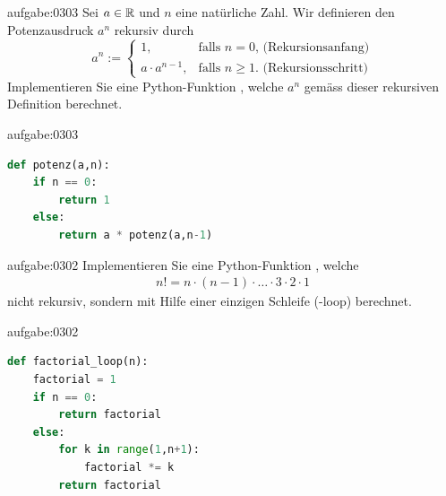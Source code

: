 \clearpage

\begin{aufgabe}{aufgabe:0303}
Sei $a\in\mathbb{R}$ und $n$ eine natürliche Zahl. Wir definieren den Potenzausdruck $a^n$ rekursiv durch
\[
  a^n := 
  \begin{cases}
    1, &\text{falls $n=0$, (Rekursionsanfang)} \\
    a\cdot a^{n-1}, & \text{falls  $n\geq 1$. (Rekursionsschritt)}
  \end{cases}
\]
Implementieren Sie eine Python-Funktion , welche $a^n$ gemäss dieser rekursiven Definition berechnet.
\end{aufgabe}
\begin{antwort}{aufgabe:0303}
\begin{lstlisting}[language=Python,caption=rekursive Potenz-Funktion]
def potenz(a,n):
    if n == 0:
        return 1
    else:
        return a * potenz(a,n-1)
\end{lstlisting}
\end{antwort}

\begin{aufgabe}{aufgabe:0302}
Implementieren Sie eine Python-Funktion , welche
\begin{align*}
    n! = n\cdot (n-1)\cdot\ldots\cdot 3\cdot 2\cdot 1
\end{align*}
nicht rekursiv, sondern mit Hilfe einer einzigen Schleife (-loop) berechnet.
\end{aufgabe}
\begin{antwort}{aufgabe:0302}
\begin{lstlisting}[language=Python,caption=rekursive Potenz-Funktion]
def factorial_loop(n):
    factorial = 1
    if n == 0:
        return factorial
    else:
        for k in range(1,n+1):
            factorial *= k
        return factorial
\end{lstlisting}
\end{antwort}

